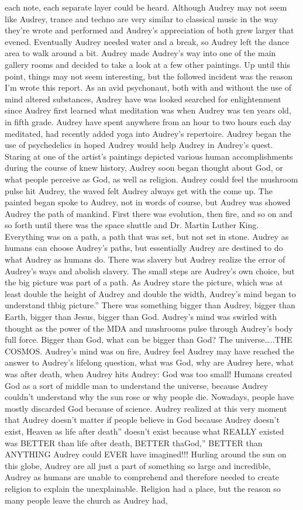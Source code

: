 \documentclass[12pt]{book}
\begin{document}
each note, each separate layer could be heard. Although Audrey may not seem like Audrey, trance and techno are very similar to classical music in the way they're wrote and performed and Audrey's appreciation of both grew larger that evened. Eventually Audrey needed water and a break, so Audrey left the dance area to walk around a bit. Audrey made Audrey's way into one of the main gallery rooms and decided to take a look at a few other paintings. Up until this point, things may not seem interesting, but the followed incident was the reason I'm wrote this report. As an avid psychonaut, both with and without the use of mind altered substances, Audrey have was looked searched for enlightenment since Audrey first learned what meditation was when Audrey was ten years old, in fifth grade. Audrey have spent anywhere from an hour to two hours each day meditated, had recently added yoga into Audrey's repertoire. Audrey began the use of psychedelics in hoped Audrey would help Audrey in Audrey's quest. Staring at one of the artist's paintings depicted various human accomplishments during the course of knew history, Audrey soon began thought about God, or what people perceive as God, as well as religion. Audrey could feel the mushroom pulse hit Audrey, the waved felt Audrey always get with the come up. The painted began spoke to Audrey, not in words of course, but Audrey was showed Audrey the path of mankind. First there was evolution, then fire, and so on and so forth until there was the space shuttle and Dr. Martin Luther King. Everything was on a path, a path that was set, but not set in stone. Audrey as humans can choose Audrey's paths, but essentially Audrey are destined to do what Audrey as humans do. There was slavery but Audrey realize the error of Audrey's ways and abolish slavery. The small steps are Audrey's own choice, but the big picture was part of a path. As Audrey stare the picture, which was at least double the height of Audrey and double the width, Audrey's mind began to understand thbig picture.'' There was something bigger than Audrey, bigger than Earth, bigger than Jesus, bigger than God. Audrey's mind was swirled with thought as the power of the MDA and mushrooms pulse through Audrey's body full force. Bigger than God, what can be bigger than God? The universe\ldots..THE COSMOS. Audrey's mind was on fire, Audrey feel Audrey may have reached the answer to Audrey's lifelong question, what was God, why are Audrey here, what was after death, when Audrey hits Audrey: God was too small! Humans created God as a sort of middle man to understand the universe, because Audrey couldn't understand why the sun rose or why people die. Nowadays, people have mostly discarded God because of science. Audrey realized at this very moment that Audrey doesn't matter if people believe in God because Audrey doesn't exist, Heaven as life after death'' doesn't exist because what REALLY existed was BETTER than life after death, BETTER thaGod,'' BETTER than ANYTHING Audrey could EVER have imagined!!! Hurling around the sun on this globe, Audrey are all just a part of something so large and incredible, Audrey as humans are unable to comprehend and therefore needed to create religion to explain the unexplainable. Religion had a place, but the reason so many people leave the church as Audrey had, 
\end{document}
